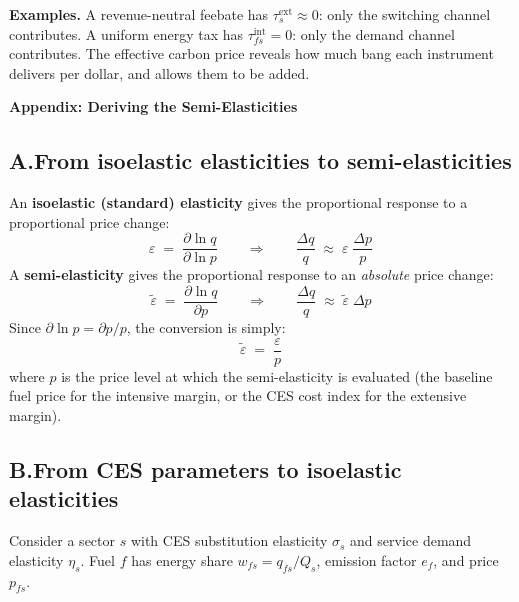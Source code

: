\documentclass[11pt,a4paper]{article}
\begin{document}
\textbf{Examples.} A revenue-neutral feebate has $\tau^{\mathrm{ext}}_s \approx 0$: only the switching channel contributes. A uniform energy tax has $\tau^{\mathrm{int}}_{fs} = 0$: only the demand channel contributes. The effective carbon price reveals how much bang each instrument delivers per dollar, and allows them to be added.


\newpage

\begin{center}
{\Large\bfseries Appendix: Deriving the Semi-Elasticities}
\end{center}

\vspace{0.5em}

\subsection*{A.\quad From isoelastic elasticities to semi-elasticities}

An \textbf{isoelastic (standard) elasticity} gives the proportional response to a proportional price change:
\[
\varepsilon \;=\; \frac{\partial \ln q}{\partial \ln p}
\qquad\Longrightarrow\qquad
\frac{\Delta q}{q} \;\approx\; \varepsilon \;\frac{\Delta p}{p}
\]
A \textbf{semi-elasticity} gives the proportional response to an \emph{absolute} price change:
\[
\tilde{\varepsilon} \;=\; \frac{\partial \ln q}{\partial p}
\qquad\Longrightarrow\qquad
\frac{\Delta q}{q} \;\approx\; \tilde{\varepsilon} \;\Delta p
\]
Since $\partial \ln p = \partial p / p$, the conversion is simply:
\begin{equation}
\boxed{\;\tilde{\varepsilon} \;=\; \frac{\varepsilon}{p}\;}
\end{equation}
where $p$ is the price level at which the semi-elasticity is evaluated (the baseline fuel price for the intensive margin, or the CES cost index for the extensive margin).


\subsection*{B.\quad From CES parameters to isoelastic elasticities}

Consider a sector $s$ with CES substitution elasticity $\sigma_s$ and service demand elasticity $\eta_s$. Fuel $f$ has energy share $w_{fs} = q_{fs}/Q_s$, emission factor $e_f$, and price $p_{fs}$.
\end{document}
